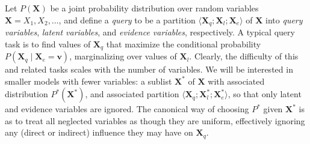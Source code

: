 \documentclass[10pt,letterpaper]{article}
\begin{document}
Let $P(\textbf{X})$ be a joint probability distribution over random variables $\textbf{X} = X_1,X_2,\dots$, and define a \emph{query} to be a partition $\langle \textbf{X}_q;\textbf{X}_l;\textbf{X}_e\rangle$ of \textbf{X} into \emph{query variables}, \emph{latent variables}, and \emph{evidence variables}, respectively. A typical query task is to find values of $\textbf{X}_q$ that maximize the conditional probability $P(\textbf{X}_q\mid \textbf{X}_e = \textbf{v})$, marginalizing over values of $\textbf{X}_l$. Clearly, the difficulty of this and related tasks scales with the number of variables. We will be interested in smaller models with fewer variables: a sublist $\textbf{X}^*$ of $\textbf{X}$ with associated distribution $P^*(\textbf{X}^*)$, and associated partition $\langle \textbf{X}_q;\textbf{X}_l^*;\textbf{X}_e^*\rangle$, so that only latent and evidence variables are ignored. The canonical way of choosing $P^*$ given $\textbf{X}^*$ is as to treat all neglected variables as though they are uniform, effectively ignoring any (direct or indirect) influence they may have on $\textbf{X}_q$.
\end{document}
